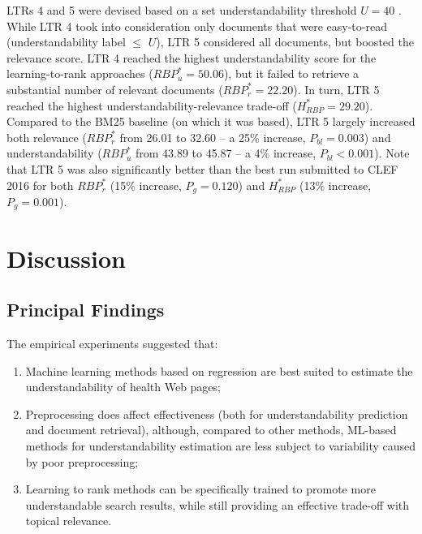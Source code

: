 \documentclass[10pt,a4paper]{article}
\begin{document}
LTRs 4 and 5 were devised based on a set understandability threshold $U=40$ . While LTR 4 took into consideration only documents that were easy-to-read (understandability label $\le$ $U$), LTR 5 considered all documents, but boosted the relevance score. LTR 4 reached the highest understandability score for the learning-to-rank approaches ($RBP_u^{*}=50.06$), but it failed to retrieve a substantial number of relevant documents ($RBP_r^{*}=22.20$). In turn, LTR 5 reached the highest
understandability-relevance trade-off ($H_{RBP}^{*}=29.20$). Compared to the BM25 baseline (on which it was based), LTR 5  largely increased both relevance ($RBP_r^*$ from 26.01 to 32.60 -- a 25\% increase, $P_{bl}=0.003$) and understandability ($RBP_u^*$ from 43.89 to 45.87 -- a 4\% increase, $P_{bl}<0.001$). Note that LTR 5 was also significantly better than the best run submitted to CLEF 2016 for both $RBP_r^{*}$ (15\% increase, $P_{g}=0.120$) and $H_{RBP}^{*}$ (13\% increase, $P_{g}=0.001$).


\section*{Discussion}

\subsection*{Principal Findings}

The empirical experiments suggested that:

\vspace{-4pt}
\begin{enumerate}[leftmargin=*]
	\item Machine learning methods based on regression are best suited to estimate the understandability of health Web pages;
	\item Preprocessing does affect effectiveness (both for understandability prediction and document retrieval), although, compared to other methods, ML-based methods for understandability estimation are less subject to variability caused by poor preprocessing;
	\item Learning to rank methods can be specifically trained to promote more understandable search results, while still providing an effective trade-off with topical relevance.
\end{enumerate} 
\end{document}
